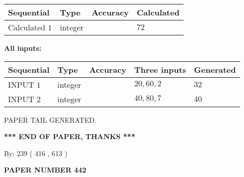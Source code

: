 \documentclass[12pt]{article}
\begin{document}
   
   
   
\noindent{}
   
   
  
  
\noindent\begin{tabular}{|l|l|l|l|}
\hline
 Sequential & Type & Accuracy & Calculated \\ 
\hline
 
 
  Calculated $  1 $ & integer &  & 
  $ 72 $ 
 \\  \hline  
 \end{tabular}
   
   
   
   
\noindent\vspace{0.1in}\hspace{-0.08in} {\textbf{\Large{All inputs: }}}
   
   
  
  
\noindent\begin{tabular}{|l|l|l|l|l|}
\hline
 Sequential & Type & Accuracy & Three inputs & Generated \\ 
\hline
 
 
  INPUT $  1 $ & integer &  & $
 20
 , 
 60
 , 
 2
 $ & $ 32 $ 
 \\  \hline  
 
 
  INPUT $  2 $ & integer &  & $
 40
 , 
 80
 , 
 7
 $ & $ 40 $ 
 \\  \hline  
 \end{tabular}
   
   
   
   
   
   
 \vspace{0.2in}
 
   
   
\vspace{2.0in} PAPER TAIL GENERATED.
   
   
   
   
\vspace{1.0in} 
{\textbf{\large{ *** END OF PAPER, THANKS *** }}} 
   
   
\hspace{1.0in} By: 
 239 ( 416 ,  613 )
   
   
   
   
\newpage 
\setcounter{page}{ 
   442001 } 
   
   
   
   
 {\textbf{ \Large{ PAPER NUMBER  442  }}}
   
\end{document}
